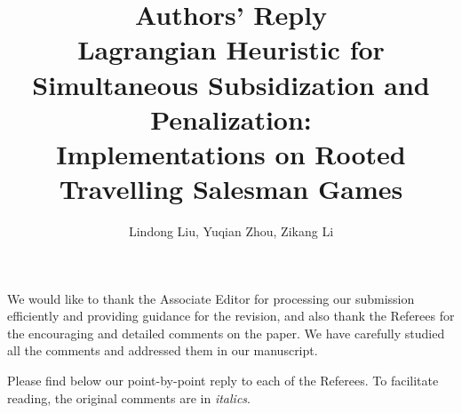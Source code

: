 \documentclass[11pt]{article}
\title{\textbf{Authors' Reply\\Lagrangian Heuristic for Simultaneous Subsidization and Penalization:\\
Implementations on Rooted Travelling Salesman Games}}
\author{Lindong Liu, Yuqian Zhou, Zikang Li}
\date{}
\begin{document}
\maketitle

\noindent

We would like to thank the Associate Editor for processing our submission efficiently and providing guidance for the revision, and also thank the Referees for the encouraging and detailed comments on the paper.
We have carefully studied all the comments and addressed them in our manuscript.

%
%
%
%
%
%
%
%
%

Please find below our point-by-point reply to each of the Referees. To facilitate reading, the original comments are in {\it italics}.

\newpage
\end{document}

